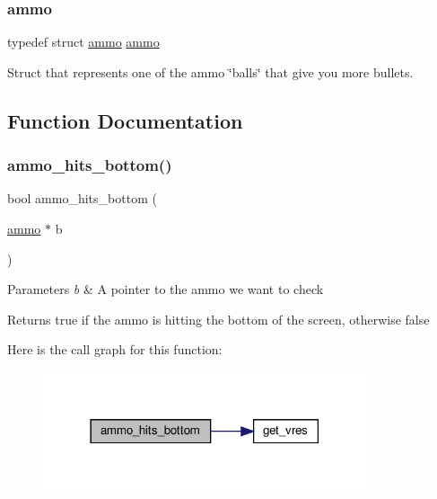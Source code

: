 \subsubsection{\texorpdfstring{ammo}{ammo}}
{\footnotesize\ttfamily typedef struct \hyperlink{structammo}{ammo}  \hyperlink{structammo}{ammo}}



Struct that represents one of the ammo \char`\"{}balls\char`\"{} that give you more bullets. 



\subsection{Function Documentation}
\mbox{\label{group__ammo_gaec2edee56f7204786a3640973e4f8f7f}} 
\subsubsection{\texorpdfstring{ammo\+\_\+hits\+\_\+bottom()}{ammo\_hits\_bottom()}}
{\footnotesize\ttfamily bool ammo\+\_\+hits\+\_\+bottom (\begin{DoxyParamCaption}\item[{\hyperlink{structammo}{ammo} $\ast$}]{b }\end{DoxyParamCaption})}


\begin{DoxyParams}{Parameters}
{\em b} & A pointer to the ammo we want to check \\
\hline
\end{DoxyParams}
\begin{DoxyReturn}{Returns}
true if the ammo is hitting the bottom of the screen, otherwise false 
\end{DoxyReturn}
Here is the call graph for this function\+:\nopagebreak
\begin{figure}[H]
\begin{center}
\leavevmode
\includegraphics[width=270pt]{group__ammo_gaec2edee56f7204786a3640973e4f8f7f_cgraph}
\end{center}
\end{figure}
\mbox{\label{group__ammo_ga23525b3b56d7c2217da8179045d80db6}} 
